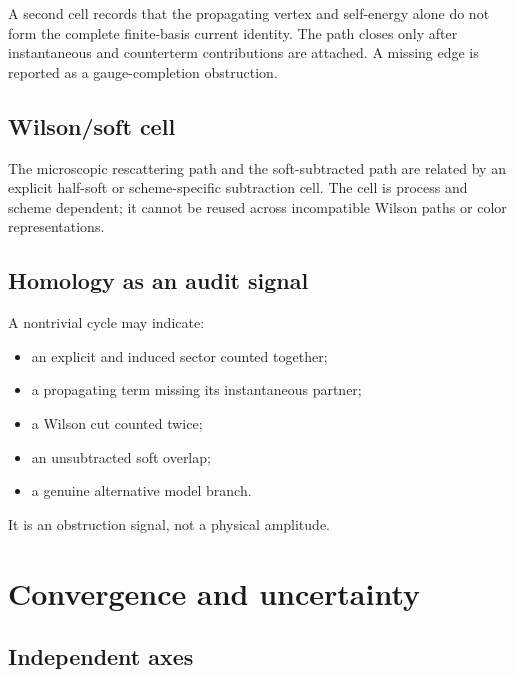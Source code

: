 \documentclass[11pt]{article}
\begin{document}
A second cell records that the propagating vertex and self-energy alone do not
form the complete finite-basis current identity.  The path closes only after
instantaneous and counterterm contributions are attached.  A missing edge is
reported as a gauge-completion obstruction.

\subsection{Wilson/soft cell}

The microscopic rescattering path and the soft-subtracted path are related by
an explicit half-soft or scheme-specific subtraction cell.  The cell is
process and scheme dependent; it cannot be reused across incompatible Wilson
paths or color representations.

\subsection{Homology as an audit signal}

A nontrivial cycle may indicate:
\begin{itemize}
 \item an explicit and induced sector counted together;
 \item a propagating term missing its instantaneous partner;
 \item a Wilson cut counted twice;
 \item an unsubtracted soft overlap;
 \item a genuine alternative model branch.
\end{itemize}
It is an obstruction signal, not a physical amplitude.

\section{Convergence and uncertainty}

\subsection{Independent axes}
\end{document}
